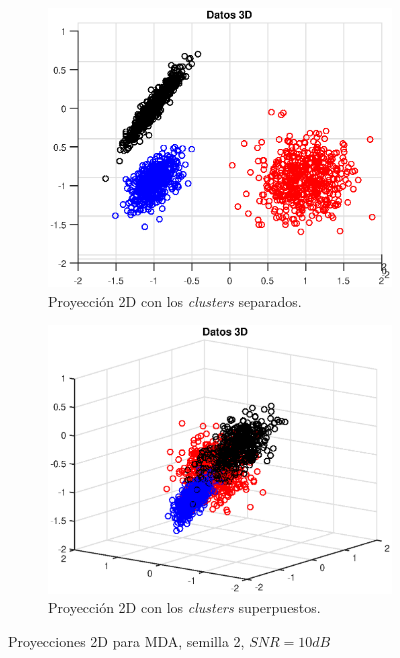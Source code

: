 \documentclass[11pt]{article} %
\begin{document}
\begin{figure}[h]
	\centering
	\begin{subfigure}[b]{0.435\textwidth}
		\includegraphics[width=\textwidth]{../21_seleccion/2_mda_separadas.eps}
		\caption[]{\small Proyección 2D con los \emph{clusters} separados.}
		\label{fig:select:mda_separate}
	\end{subfigure}
	\quad
	\begin{subfigure}[b]{0.435\textwidth}
		\includegraphics[width=\textwidth]{../21_seleccion/2_mda_juntas.eps}
		\caption[]{\small Proyección 2D con los \emph{clusters} superpuestos.}
		\label{fig:select:mda_overlaid}
	\end{subfigure}
	\caption{Proyecciones 2D para MDA, semilla 2, $SNR=10dB$}
\end{figure}
\end{document}
